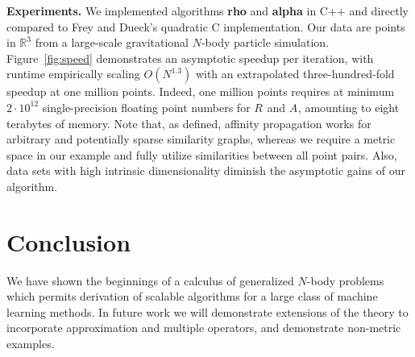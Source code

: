 \documentclass{article}
\newcommand{\killspace}{\vspace{-0.08in}}
\newcommand{\mysection}[1]{\vspace{-0.04in}\section{#1}\killspace}
\newcommand{\respo}[2]{R_{#1#2}}
\newcommand{\avail}[2]{A_{#1#2}}
\begin{document}
{\bf Experiments.} We implemented algorithms {\bf rho} and {\bf alpha} in C++ and directly compared to Frey and Dueck's quadratic C implementation.
Our data are points in $\mathbb{R}^3$ from a large-scale gravitational $N$-body particle simulation.
Figure~\ref{fig:speed} demonstrates an asymptotic speedup per iteration, with runtime empirically scaling $O(N^{1.3})$ with an extrapolated three-hundred-fold speedup at one million points.
Indeed, one million points requires at minimum $2 \cdot 10^{12}$ single-precision floating point numbers for $\respo{}{}$ and $\avail{}{}$, amounting to eight terabytes of memory.
Note that, as defined, affinity propagation works for arbitrary and potentially sparse similarity graphs, whereas we require a metric space in our example and fully utilize similarities between all point pairs.
Also, data sets with high intrinsic dimensionality diminish the asymptotic gains of our algorithm.

\mysection{Conclusion}

We have shown the beginnings of a calculus of generalized $N$-body problems which permits derivation of scalable algorithms for a large class of machine learning methods.
In future work we will demonstrate extensions of the theory to incorporate approximation and multiple operators, and demonstrate non-metric examples.

\appendix
\end{document}
